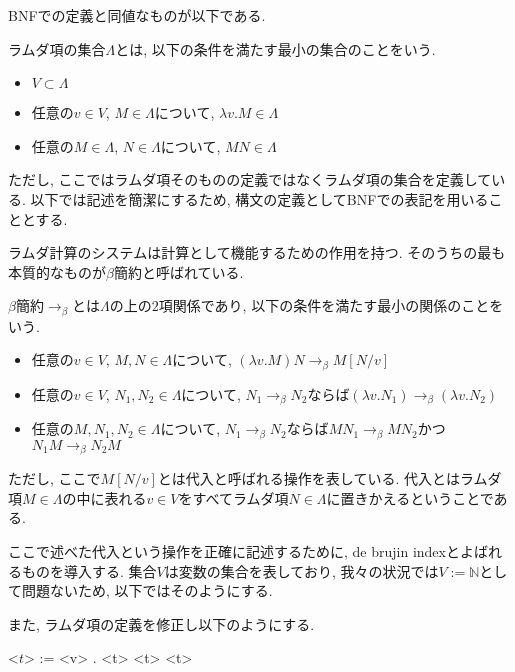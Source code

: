 \documentclass{ltjsarticle}
\begin{document}
BNFでの定義と同値なものが以下である.

\begin{defn}
 ラムダ項の集合$\Lambda$とは, 以下の条件を満たす最小の集合のことをいう.
 \begin{itemize}
  \item $V \subset \Lambda$
  \item 任意の$v \in V$, $M \in \Lambda$について, $\lambda v. M \in \Lambda$
  \item 任意の$M \in \Lambda$, $N \in \Lambda$について, $M N \in \Lambda$
 \end{itemize}
\end{defn}

ただし, ここではラムダ項そのものの定義ではなくラムダ項の集合を定義している. 以下では記述を簡潔にするため, 構文の定義としてBNFでの表記を用いることとする.

ラムダ計算のシステムは計算として機能するための作用を持つ. そのうちの最も本質的なものが$\beta$簡約と呼ばれている.

\begin{defn}
 $\beta$簡約$\rightarrow_{\beta}$とは$\Lambda$の上の$2$項関係であり, 以下の条件を満たす最小の関係のことをいう.
 \begin{itemize}
  \item 任意の$v \in V$, $M, N \in \Lambda$について, $(\lambda v. M) N \rightarrow_\beta M[N/v]$
  \item 任意の$v \in V$, $N_1, N_2 \in \Lambda$について, $N_1 \rightarrow_\beta N_2$ならば$(\lambda v. N_1) \rightarrow_\beta (\lambda v. N_2)$
  \item 任意の$M, N_1, N_2 \in \Lambda$について, $N_1 \rightarrow_\beta N_2$ならば$M N_1 \rightarrow_\beta M N_2$かつ$N_1 M \rightarrow_\beta N_2 M$
 \end{itemize}
 ただし, ここで$M[N/v]$とは代入と呼ばれる操作を表している. 代入とはラムダ項$M \in \Lambda$の中に表れる$v \in V$をすべてラムダ項$N \in \Lambda$に置きかえるということである.
\end{defn}

ここで述べた代入という操作を正確に記述するために, de brujin indexとよばれるものを導入する.
集合$V$は変数の集合を表しており, 我々の状況では$V := \mathbb{N}$として問題ないため, 以下ではそのようにする.

また, ラムダ項の定義を修正し以下のようにする.

\begin{defn}
\begin{grammar}
 <$t$> := <v> \alt \lambda. <t> \alt <t> <t>
\end{grammar}
\end{defn}
\end{document}
